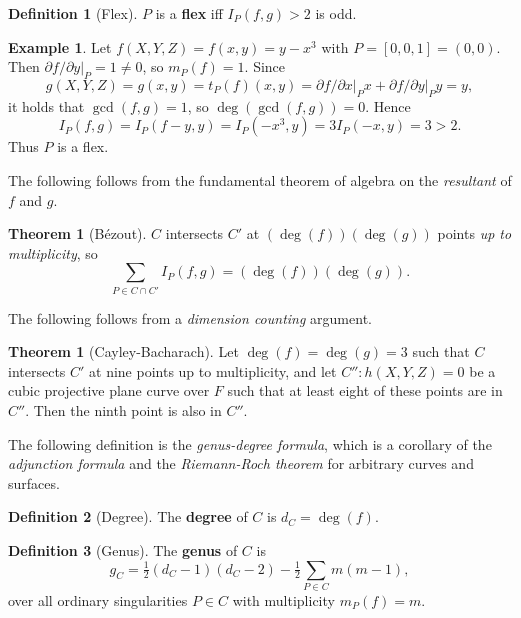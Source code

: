 \documentclass{article}
\newcommand{\val}[1]{\left. #1 \right\rvert}
\newcommand{\rb}[1]{\left( #1 \right)}
\renewcommand{\sb}[1]{\left[ #1 \right]}
\theoremstyle{definition}
\newtheorem*{definition}{Definition}
\newtheorem*{example}{Example}
\newtheorem{theorem}[proposition]{Theorem}
\begin{document}
\begin{definition}[Flex]
$ P $ is a \textbf{flex} iff $ I_P\rb{f, g} > 2 $ is odd.
\end{definition}

\begin{example}
Let $ f\rb{X, Y, Z} = f\rb{x, y} = y - x^3 $ with $ P = \sb{0, 0, 1} = \rb{0, 0} $. Then $ \val{\partial f / \partial y}_P = 1 \ne 0 $, so $ m_P\rb{f} = 1 $. Since
$$ g\rb{X, Y, Z} = g\rb{x, y} = t_P\rb{f}\rb{x, y} = \val{\partial f / \partial x}_Px + \val{\partial f / \partial y}_Py = y, $$
it holds that $ \gcd\rb{f, g} = 1 $, so $ \deg\rb{\gcd\rb{f, g}} = 0 $. Hence
$$ I_P\rb{f, g} = I_P\rb{f - y, y} = I_P\rb{-x^3, y} = 3I_P\rb{-x, y} = 3 > 2. $$
Thus $ P $ is a flex.
\end{example}

The following follows from the fundamental theorem of algebra on the \emph{resultant} of $ f $ and $ g $.

\begin{theorem}[B\'ezout]
$ C $ intersects $ C' $ at $ \rb{\deg\rb{f}}\rb{\deg\rb{g}} $ points \emph{up to multiplicity}, so
$$ \sum_{P \in C \cap C'} I_P\rb{f, g} = \rb{\deg\rb{f}}\rb{\deg\rb{g}}. $$
\end{theorem}

The following follows from a \emph{dimension counting} argument.

\begin{theorem}[Cayley-Bacharach]
Let $ \deg\rb{f} = \deg\rb{g} = 3 $ such that $ C $ intersects $ C' $ at nine points up to multiplicity, and let $ C'' : h\rb{X, Y, Z} = 0 $ be a cubic projective plane curve over $ F $ such that at least eight of these points are in $ C'' $. Then the ninth point is also in $ C'' $.
\end{theorem}

The following definition is the \emph{genus-degree formula}, which is a corollary of the \emph{adjunction formula} and the \emph{Riemann-Roch theorem} for arbitrary curves and surfaces.

\begin{definition}[Degree]
The \textbf{degree} of $ C $ is $ d_C = \deg\rb{f} $.
\end{definition}

\begin{definition}[Genus]
The \textbf{genus} of $ C $ is
$$ g_C = \tfrac{1}{2}\rb{d_C - 1}\rb{d_C - 2} - \tfrac{1}{2}\sum_{P \in C} m\rb{m - 1}, $$
over all ordinary singularities $ P \in C $ with multiplicity $ m_P\rb{f} = m $.
\end{definition}
\end{document}
